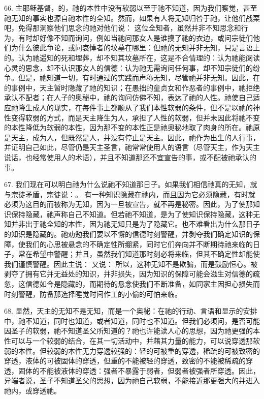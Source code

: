 66. 主耶稣基督，的，祂的本性中没有软弱以至于祂不知道，因为我们察觉，甚至祂无知的事实也源自祂本性的全知。然而，如果有人将无知归咎于祂，让他们战栗吧，免得那洞察他们思念的祂对他们说： 这位全知者，虽然并非不知思念和行为，有时却好像不知而询问，例如当祂问那女人是谁摸了祂的衣边，或问宗徒们他们为什么彼此争论，或问哀悼者的坟墓在哪里：但祂的无知并非无知，只是言语上的。认为祂遥知的死和埋葬，却不知其坟墓所在，这是不合情理的：认为祂能阅读心灵的思念，却不认识那女人的信德：认为祂无需询问任何事，却不知宗徒们的纷争。但是，祂知道一切，有时通过的实践而声称无知，尽管祂并非无知。因此，在的事例中，天主暂时隐藏了祂的知识；在愚拙的童贞女和作恶者的事例中，祂拒绝承认不配者；在人子的奥秘中，祂的询问仿佛不知，表达了祂的人性。祂使自己适应祂降生成人的现实，在每件事上都顺从了我们本性软弱的条件，但不是以祂的神性变得软弱的方式，而是天主降生为人，承担了人性的软弱，但并未因此将祂不变的本性降低为软弱的本性，因为那不变的本性正是祂奥秘地取了肉身的所在。祂原是天主，成为人，但既然是人，并没有停止是天主。因此，祂作为出生的人行事，并证明自己如此，尽管仍是天主圣言，祂常常使用人的语言（尽管天主，作为天主说话，也经常使用人的术语），并且不知道那还不宜宣告的事，或不配被祂承认的事。\par

67. 我们现在可以明白祂为什么说祂不知道那日子。如果我们相信祂真的无知，就与宗徒矛盾，宗徒说：。 有一种知识隐藏在祂内，而且因为它必须隐藏，有时就必须为这目的而被称为无知，因为一旦被宣告，就不再是秘密。因此，为了使那知识保持隐藏，祂声称自己不知道。但若祂不知道，是为了使知识保持隐藏，这种无知并非出于祂全知的本性，因为祂无知只是为了隐藏它。也不难看出为什么那日子的知识是隐藏的。祂劝勉我们要以不懈的信德时刻警醒，并剥夺我们确定知识的保障，使我们的心思被悬念的不确定性所绷紧，同时它们奔向并不断期待祂来临的日子，常在希望中警醒；并且，虽然我们知道那时刻必将来临，但其不确定性却能使我们谨慎警醒。因此主说： 又说： 所以，这种无知不是欺骗，而是鼓励恒心。被剥夺了拥有它并无益处的知识，并非损失，因为知识的保障可能会滋生对信德的疏忽，这信德如今是隐藏的，而期待的悬念使我们不断准备，如同家主因担心损失而时刻警醒，防备那选择睡觉时间作工的小偷的可怕来临。\par

68. 显然，天主的无知不是无知，而是一个奥秘：在祂的行动、言语和显示的安排中，祂不知道，同时也知道，或者知道，同时也不知道。但我们必须问，是否可能因圣子的软弱，祂不知道圣父所知道的？祂也许能读人心的思想，因为祂更强的本性可以与一个较弱的结合，在其一切活动中，并藉其力量的能力，可以说穿透那软弱的本性。但较弱的本性无力穿透较强的：轻的可被重的穿透，稀疏的可被致密的穿透，液体的可被固体的穿透，但重的不能被轻的穿透，致密的不能被稀疏的穿透，固体的不能被液体的穿透：强者不暴露于弱者，但弱者被强者所穿透。因此，异端者说，圣子不知道圣父的思想，因为祂自己软弱，不能接近那更强大的并进入祂内，或穿透祂。\par

